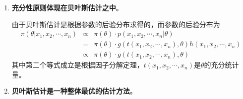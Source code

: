 \begin{remark}
\begin{enumerate}
    \item \textbf{充分性原则体现在贝叶斯估计之中}。

    由于贝叶斯估计是根据参数的后验分布求得的，而参数的后验分布为
    \begin{eqnarray*}
        \pi(\theta | x_1,x_2,\cdots,x_n) &\propto&  \pi(\theta) \cdot p(x_1,x_2,\cdots,x_n|\theta)\\
        &=& \pi(\theta) \cdot g(t(x_1,x_2,\cdots,x_n),\theta) h(x_1,x_2,\cdots,x_n)\\
        &\propto&  \pi(\theta) \cdot g(t(x_1,x_2,\cdots,x_n),\theta)
    \end{eqnarray*}
    其中第二个等式成立是根据因子分解定理，$t(x_1,x_2,\cdots,x_n)$是$\theta$的充分统计量。

    \item  \textbf{贝叶斯估计是一种整体最优的估计方法}。
    

\end{enumerate}
\end{remark}
